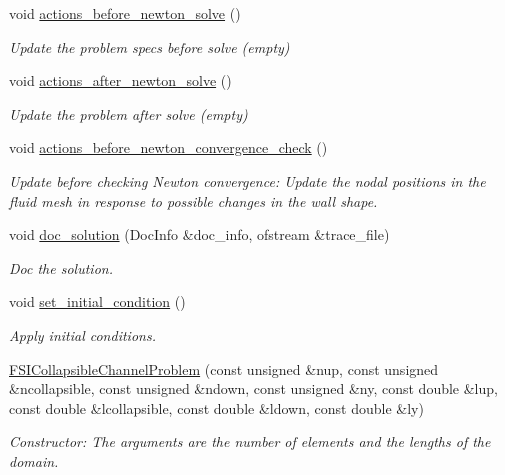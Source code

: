 \begin{DoxyCompactItemize}
void \hyperlink{classFSICollapsibleChannelProblem_ad10b2d12be052c6b1bc5005dc27cd229}{actions\+\_\+before\+\_\+newton\+\_\+solve} ()
\begin{DoxyCompactList}\small\item\em Update the problem specs before solve (empty) \end{DoxyCompactList}\item 
void \hyperlink{classFSICollapsibleChannelProblem_a49780267c05f4c6ecbed11bfc6b9956b}{actions\+\_\+after\+\_\+newton\+\_\+solve} ()
\begin{DoxyCompactList}\small\item\em Update the problem after solve (empty) \end{DoxyCompactList}\item 
void \hyperlink{classFSICollapsibleChannelProblem_ace5343d2e6e6e0480d077d4f17365288}{actions\+\_\+before\+\_\+newton\+\_\+convergence\+\_\+check} ()
\begin{DoxyCompactList}\small\item\em Update before checking Newton convergence\+: Update the nodal positions in the fluid mesh in response to possible changes in the wall shape. \end{DoxyCompactList}\item 
void \hyperlink{classFSICollapsibleChannelProblem_aff5cacbc8d81f6c1beda947085496462}{doc\+\_\+solution} (Doc\+Info \&doc\+\_\+info, ofstream \&trace\+\_\+file)
\begin{DoxyCompactList}\small\item\em Doc the solution. \end{DoxyCompactList}\item 
void \hyperlink{classFSICollapsibleChannelProblem_afdd6752cb134fd09ee8830158ed557b2}{set\+\_\+initial\+\_\+condition} ()
\begin{DoxyCompactList}\small\item\em Apply initial conditions. \end{DoxyCompactList}\item 
\hyperlink{classFSICollapsibleChannelProblem_afe14ae0d2bdfc9a15969c9bdcd6e2512}{F\+S\+I\+Collapsible\+Channel\+Problem} (const unsigned \&nup, const unsigned \&ncollapsible, const unsigned \&ndown, const unsigned \&ny, const double \&lup, const double \&lcollapsible, const double \&ldown, const double \&ly)
\begin{DoxyCompactList}\small\item\em Constructor\+: The arguments are the number of elements and the lengths of the domain. \end{DoxyCompactList}\item 

\end{DoxyCompactItemize}
